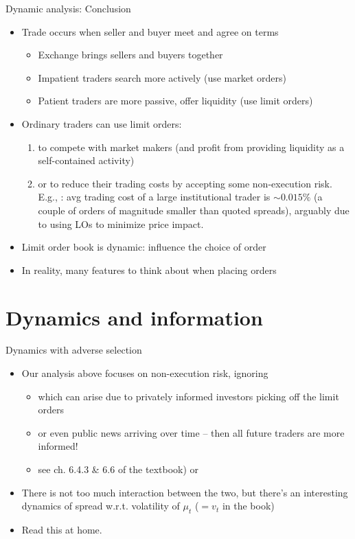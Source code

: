 \documentclass[english,10pt
,aspectratio=169
]{beamer}
\begin{document}
\begin{frame}[label=parlourmain]{Dynamic analysis: Conclusion}
\begin{itemize}
	\item Trade occurs when seller and buyer meet and agree on terms
	\begin{itemize}
		\item Exchange brings sellers and buyers together
		\item Impatient traders search more actively (use market orders)
		\item Patient traders are more passive, offer liquidity (use limit orders)
	\end{itemize}
	\item Ordinary traders can use limit orders:
	\begin{enumerate}
		\item to compete with market makers (and profit from providing liquidity as a self-contained activity)
		\item or to reduce their trading costs by accepting some non-execution risk. E.g., \citet*{frazzini_trading_2018}: avg trading cost of a large institutional trader is $\sim 0.015\%$ (a couple of orders of magnitude smaller than quoted spreads), arguably due to using LOs to minimize price impact.
	\end{enumerate}
	\item Limit order book is dynamic: influence the choice of order
	\item In reality, many features to think about when placing orders
\end{itemize}
\end{frame}



\section{Dynamics and information}

\begin{frame}{Dynamics with adverse selection}
	\begin{itemize}
		\item Our analysis above focuses on non-execution risk, ignoring 
		\begin{itemize}
			\item which can arise due to privately informed investors picking off the limit orders
			\item or even \alert{public news} arriving over time -- then all future traders are more informed!
			\item see ch. 6.4.3 \& 6.6 of the textbook) or \hyperlink{adverse}{}
		\end{itemize}
		\item There is not too much interaction between the two, but there's an interesting dynamics of spread w.r.t. volatility of $\mu_t$ ($=v_t$ in the book)
		\item Read this at home.
	\end{itemize}
\end{frame}
\end{document}
